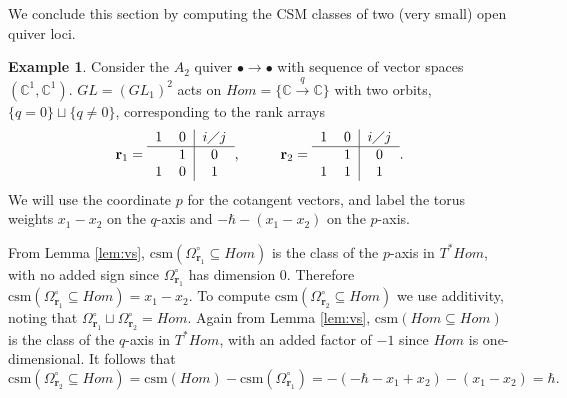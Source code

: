 \documentclass[reqno]{amsart}
\newcommand{\C}{\mathbb{C}}
\newcommand{\csm}{\textrm{csm}}
\numberwithin{equation}{section}
\theoremstyle{definition}
\newtheorem{example}[theorem]{Example}
\theoremstyle{remark}
\begin{document}

We conclude this section by computing the CSM classes of two (very small) open quiver loci.
\begin{example}
Consider the $A_2$ quiver $\bullet \to \bullet$ with sequence of vector spaces $(\C^1,\C^1)$. $GL=(GL_1)^2$ acts on $Hom= \{\C \xrightarrow{q} \C\}$ with two orbits, $\{q=0\} \sqcup \{q \neq 0\}$, corresponding to the rank arrays
\[\mathbf{r}_1=
\begin{tabular}{c c|c}
    1 & 0 & $i \diagup j$\\\hline
     & 1 & 0\\
    1 & 0 & 1
\end{tabular}, \hspace{1cm} \mathbf{r}_2=
\begin{tabular}{c c|c}
    1 & 0 & $i \diagup j$\\\hline
     & 1 & 0\\
    1 & 1 & 1
\end{tabular}.\]
We will use the coordinate $p$ for the cotangent vectors, and label the torus weights $x_1-x_2$ on the $q$-axis and $-\hbar-(x_1-x_2)$ on the $p$-axis.

From Lemma \ref{lem:vs}, $\csm(\Omega_{\mathbf{r}_1}^\circ \subseteq Hom)$ is the class of the $p$-axis in $T^*Hom$, with no added sign since $\Omega_{\mathbf{r}_1}^\circ$ has dimension 0. Therefore $\csm(\Omega_{\mathbf{r}_1}^\circ \subseteq Hom)=x_1-x_2$.
To compute $\csm(\Omega_{\mathbf{r}_2}^\circ \subseteq Hom)$ we use additivity, noting that $\Omega_{\mathbf{r}_1}^\circ \sqcup \Omega_{\mathbf{r}_2}^\circ = Hom$. Again from Lemma \ref{lem:vs}, $\csm(Hom \subseteq Hom)$ is the class of the $q$-axis in $T^*Hom$, with an added factor of $-1$ since $Hom$ is one-dimensional. It follows that
\[\csm(\Omega_{\mathbf{r}_2}^\circ \subseteq Hom)=\csm(Hom)-\csm(\Omega_{\mathbf{r}_1}^\circ)=-(-\hbar-x_1+x_2) -(x_1-x_2)=\hbar.\]
\end{example}
\end{document}
